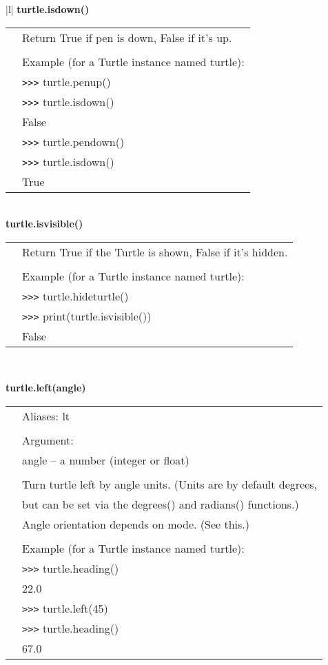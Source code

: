 \begin{center}
{\begin{tabular}{|l|}
{\bf    turtle.isdown()} \\
   \begin{tabular}{p{0.25in}p{4in}}
&        Return True if pen is down, False if it's up. \\
&  \\
&        Example (for a Turtle instance named turtle): \\
&        \verb+>+\verb+>+\verb+>+ turtle.penup() \\
&        \verb+>+\verb+>+\verb+>+ turtle.isdown() \\
&        False \\
&        \verb+>+\verb+>+\verb+>+ turtle.pendown() \\
&        \verb+>+\verb+>+\verb+>+ turtle.isdown() \\
&        True \\
\end{tabular} \\ \hline
{\bf    turtle.isvisible()} \\
   \begin{tabular}{p{0.25in}p{4in}}
&        Return True if the Turtle is shown, False if it's hidden. \\
&  \\
&        Example (for a Turtle instance named turtle): \\
&        \verb+>+\verb+>+\verb+>+ turtle.hideturtle() \\
&        \verb+>+\verb+>+\verb+>+ print(turtle.isvisible()) \\
&        False \\
\end{tabular} \\ \hline

{\bf    turtle.left(angle)} \\
   \begin{tabular}{p{0.25in}p{4in}}
&        Aliases:  lt \\
&  \\
&        Argument: \\
&        angle -- a number (integer or float) \\
&  \\
&        Turn turtle left by angle units. (Units are by default degrees, \\
&        but can be set via the degrees() and radians() functions.) \\
&        Angle orientation depends on mode. (See this.) \\
&  \\
&        Example (for a Turtle instance named turtle): \\
&        \verb+>+\verb+>+\verb+>+ turtle.heading() \\
&        22.0 \\
&        \verb+>+\verb+>+\verb+>+ turtle.left(45) \\
&        \verb+>+\verb+>+\verb+>+ turtle.heading() \\
&        67.0 \\
\end{tabular} \\ \hline


\end{tabular}}
\end{center}
